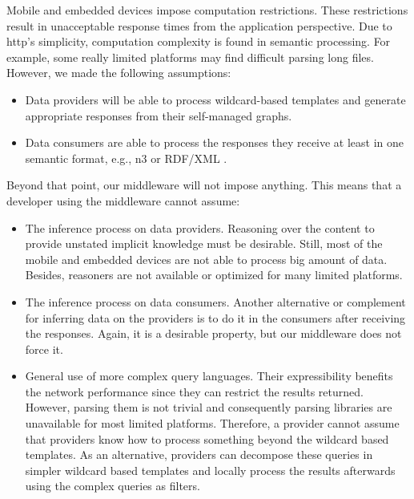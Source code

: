 Mobile and embedded devices impose computation restrictions.
These restrictions result in unacceptable response times from the application perspective.
Due to \ac{http}'s simplicity, computation complexity is found in semantic processing.
For example, some really limited platforms may find difficult parsing long files.
However, we made the following assumptions:
\begin{itemize}
  \item Data providers will be able to process wildcard-based templates and generate appropriate responses from their self-managed graphs.
  \item Data consumers are able to process the responses they receive at least in one semantic format, e.g., \acs{n3}  or RDF/XML . %
\end{itemize}


Beyond that point, our middleware will not impose anything.
This means that a developer using the middleware cannot assume:
\begin{itemize}
  \item The inference process on data providers.
        Reasoning over the content to provide unstated implicit knowledge must be desirable.
        Still, most of the mobile and embedded devices are not able to process big amount of data. %
        Besides, reasoners are not available or optimized for many limited platforms.
  \item The inference process on data consumers.
        Another alternative or complement for inferring data on the providers is to do it in the consumers after receiving the responses.
        Again, it is a desirable property, but our middleware does not force it.
  \item General use of more complex query languages.
        Their expressibility benefits the network performance since they can restrict the results returned.
        However, parsing them is not trivial and consequently parsing libraries are unavailable for most limited platforms.
        Therefore, a provider cannot assume that providers know how to process something beyond the wildcard based templates.
        As an alternative, providers can decompose these queries in simpler wildcard based templates and locally process the results afterwards using the complex queries as filters.
\end{itemize}


